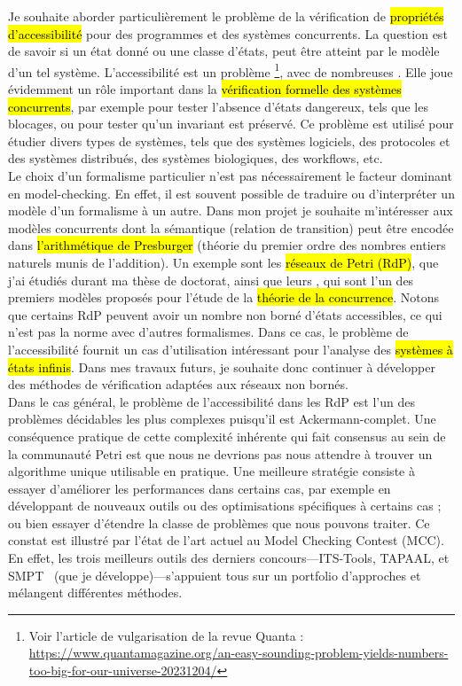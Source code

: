 Je souhaite aborder particulièrement le problème de la vérification de
\hl{propriétés d'accessibilité} pour des programmes et des systèmes concurrents.
La question est de savoir si un état donné ou une classe d'états, peut être
atteint par le modèle d'un tel système. L'accessibilité est un problème
\footnote{Voir l'article de vulgarisation de la
revue Quanta :\\
\url{https://www.quantamagazine.org/an-easy-sounding-problem-yields-numbers-too-big-for-our-universe-20231204/}},
avec de nombreuses . Elle joue évidemment un rôle
important dans la \hl{vérification formelle des systèmes concurrents}, par exemple
pour tester l'absence \og d'états dangereux\fg, tels que les blocages, ou pour
tester qu'un invariant est préservé. Ce problème est utilisé pour étudier divers
types de systèmes, tels que des systèmes
logiciels,
des protocoles et des systèmes distribués, des systèmes
biologiques, des
workflows, etc.\\

Le choix d'un formalisme particulier n'est pas nécessairement le facteur
dominant en model-checking. En effet, il est souvent possible de traduire ou
d'interpréter un modèle d'un formalisme à un autre. Dans mon projet je souhaite
m'intéresser aux modèles concurrents dont la sémantique (relation de transition)
peut être encodée dans \hl{l'arithmétique de Presburger} (théorie du premier
ordre des nombres entiers naturels munis de l'addition). Un exemple sont les
\hl{réseaux de Petri (RdP)}, que j'ai étudiés durant ma thèse de doctorat, ainsi
que leurs , qui sont l'un des premiers modèles proposés pour
l'étude de la \hl{théorie de la concurrence}. Notons que certains RdP peuvent
avoir un nombre non borné d'états accessibles, ce qui n'est pas la norme avec
d'autres formalismes. Dans ce cas, le problème de l'accessibilité fournit un cas
d'utilisation intéressant pour l'analyse des \hl{systèmes à états infinis}. Dans
mes travaux futurs, je souhaite donc continuer à développer des méthodes de
vérification adaptées aux réseaux non bornés.\\

Dans le cas général, le problème de l'accessibilité dans les RdP est l'un des
problèmes décidables les plus complexes puisqu'il est Ackermann-complet. Une
conséquence pratique de cette \og complexité inhérente \fg qui fait consensus au
sein de la communauté Petri est que nous ne devrions pas nous attendre à trouver
un algorithme unique utilisable en pratique. Une meilleure stratégie consiste à
essayer d'améliorer les performances dans certains cas, par exemple en
développant de nouveaux outils ou des optimisations spécifiques à certains cas ;
ou bien essayer d'étendre la classe de problèmes que nous pouvons traiter. 
Ce constat est illustré par l'état de l'art actuel au Model Checking Contest
(MCC). En effet, les trois meilleurs outils des derniers
concours---\textsf{ITS-Tools},
\textsf{TAPAAL}, et \textsf{SMPT}~\cite{amat_smpt_2023}
(que je développe)---s'appuient tous sur un portfolio d'approches et mélangent
différentes méthodes.\\

